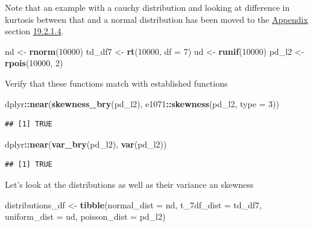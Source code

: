 \documentclass[]{book}
\newenvironment{Shaded}{\begin{snugshade}}{\end{snugshade}}
\newcommand{\DataTypeTok}[1]{\textcolor[rgb]{0.13,0.29,0.53}{#1}}
\newcommand{\DecValTok}[1]{\textcolor[rgb]{0.00,0.00,0.81}{#1}}
\newcommand{\KeywordTok}[1]{\textcolor[rgb]{0.13,0.29,0.53}{\textbf{#1}}}
\newcommand{\NormalTok}[1]{#1}
\newcommand{\OperatorTok}[1]{\textcolor[rgb]{0.81,0.36,0.00}{\textbf{#1}}}
\newcommand{\StringTok}[1]{\textcolor[rgb]{0.31,0.60,0.02}{#1}}
\theoremstyle{definition}
\theoremstyle{definition}
\theoremstyle{definition}
\theoremstyle{remark}
\begin{document}
\begin{enumerate}
  Note that an example with a cauchy distribution and looking at
  difference in kurtosis between that and a normal distribution has been
  moved to the \protect\hyperlink{appendix-10}{Appendix} section
  \protect\hyperlink{section-66}{19.2.1.4}.

\begin{Shaded}
\begin{Highlighting}[]
\NormalTok{nd <-}\StringTok{ }\KeywordTok{rnorm}\NormalTok{(}\DecValTok{10000}\NormalTok{)}
\NormalTok{td_df7 <-}\StringTok{ }\KeywordTok{rt}\NormalTok{(}\DecValTok{10000}\NormalTok{, }\DataTypeTok{df =} \DecValTok{7}\NormalTok{)}
\NormalTok{ud <-}\StringTok{ }\KeywordTok{runif}\NormalTok{(}\DecValTok{10000}\NormalTok{)}
\NormalTok{pd_l2 <-}\StringTok{ }\KeywordTok{rpois}\NormalTok{(}\DecValTok{10000}\NormalTok{, }\DecValTok{2}\NormalTok{)}
\end{Highlighting}
\end{Shaded}

  Verify that these functions match with established functions

\begin{Shaded}
\begin{Highlighting}[]
\NormalTok{dplyr}\OperatorTok{::}\KeywordTok{near}\NormalTok{(}\KeywordTok{skewness_bry}\NormalTok{(pd_l2), e1071}\OperatorTok{::}\KeywordTok{skewness}\NormalTok{(pd_l2, }\DataTypeTok{type =} \DecValTok{3}\NormalTok{))}
\end{Highlighting}
\end{Shaded}

\begin{verbatim}
## [1] TRUE
\end{verbatim}

\begin{Shaded}
\begin{Highlighting}[]
\NormalTok{dplyr}\OperatorTok{::}\KeywordTok{near}\NormalTok{(}\KeywordTok{var_bry}\NormalTok{(pd_l2), }\KeywordTok{var}\NormalTok{(pd_l2))}
\end{Highlighting}
\end{Shaded}

\begin{verbatim}
## [1] TRUE
\end{verbatim}

  Let's look at the distributions as well as their variance an skewness

\begin{Shaded}
\begin{Highlighting}[]
\NormalTok{distributions_df <-}\StringTok{ }\KeywordTok{tibble}\NormalTok{(}\DataTypeTok{normal_dist =}\NormalTok{ nd,}
       \DataTypeTok{t_7df_dist =}\NormalTok{ td_df7,}
       \DataTypeTok{uniform_dist =}\NormalTok{ ud,}
       \DataTypeTok{poisson_dist =}\NormalTok{ pd_l2)}


\end{Highlighting}
\end{Shaded}
\end{enumerate}
\end{document}
